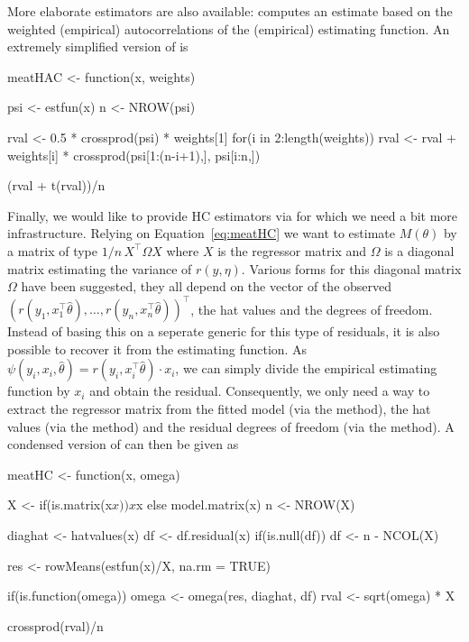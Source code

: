 \documentclass{Z}
\begin{document}
More elaborate estimators are also available:  computes an estimate based on the
weighted (empirical) autocorrelations of the (empirical) estimating function. An extremely simplified
version of  is
\begin{Schunk}
\begin{Sinput}
meatHAC <- function(x, weights)
{
  psi <- estfun(x)
  n <- NROW(psi)

  rval <- 0.5 * crossprod(psi) * weights[1]
  for(i in 2:length(weights))
    rval <- rval + weights[i] * crossprod(psi[1:(n-i+1),], psi[i:n,])
  
  (rval + t(rval))/n
}
\end{Sinput}
\end{Schunk}

Finally, we would like to provide HC estimators via 
for which we need a bit more infrastructure. Relying on Equation~\ref{eq:meatHC}
we want to estimate $M(\theta)$ by a matrix of type $1/n \, X^\top \Omega X$ where $X$
is the regressor matrix and $\Omega$ is a diagonal matrix estimating the variance of $r(y, \eta)$.
Various forms for this diagonal matrix $\Omega$ have been suggested, they all depend on
the vector of the observed $(r(y_1, x_1^\top \hat \theta), \dots, r(y_n, x_n^\top \hat \theta))^\top$,
the hat values and the degrees of freedom. Instead of basing this on a seperate generic
for this type of residuals, it is also possible to recover it from the estimating function.
As $\psi(y_i, x_i, \hat \theta) = r(y_i, x_i^\top \hat \theta) \cdot x_i$, we can simply 
divide the empirical estimating function by $x_i$ and obtain the residual.
Consequently, we only need a way to extract the regressor matrix from
the fitted model (via the  method), the hat values (via the  method)
and the residual degrees of freedom (via the  method).
A condensed version of  can then be given as
\begin{Schunk}
\begin{Sinput}
meatHC <- function(x, omega)
{
  X <- if(is.matrix(x$x)) x$x else model.matrix(x)
  n <- NROW(X)
  
  diaghat <- hatvalues(x)
  df <- df.residual(x)
  if(is.null(df)) df <- n - NCOL(X)
  
  res <- rowMeans(estfun(x)/X, na.rm = TRUE)
  
  if(is.function(omega)) omega <- omega(res, diaghat, df)
  rval <- sqrt(omega) * X
  
  crossprod(rval)/n
}
\end{Sinput}
\end{Schunk}
\end{document}
